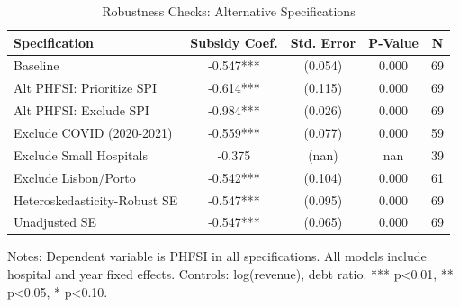 \begin{table}[htbp]
\centering
\caption{Robustness Checks: Alternative Specifications}
\label{tab:robustness}
\begin{tabular}{lcccc}
\hline\hline
Specification & Subsidy Coef. & Std. Error & P-Value & N \\
\hline
Baseline & -0.547*** & (0.054) & 0.000 & 69 \\
Alt PHFSI: Prioritize SPI & -0.614*** & (0.115) & 0.000 & 69 \\
Alt PHFSI: Exclude SPI & -0.984*** & (0.026) & 0.000 & 69 \\
Exclude COVID (2020-2021) & -0.559*** & (0.077) & 0.000 & 59 \\
Exclude Small Hospitals & -0.375 & (nan) & nan & 39 \\
Exclude Lisbon/Porto & -0.542*** & (0.104) & 0.000 & 61 \\
Heteroskedasticity-Robust SE & -0.547*** & (0.095) & 0.000 & 69 \\
Unadjusted SE & -0.547*** & (0.065) & 0.000 & 69 \\
\hline\hline
\end{tabular}
\begin{tablenotes}
\small
\item Notes: Dependent variable is PHFSI in all specifications. 
All models include hospital and year fixed effects. 
Controls: log(revenue), debt ratio. 
*** p<0.01, ** p<0.05, * p<0.10.
\end{tablenotes}
\end{table}